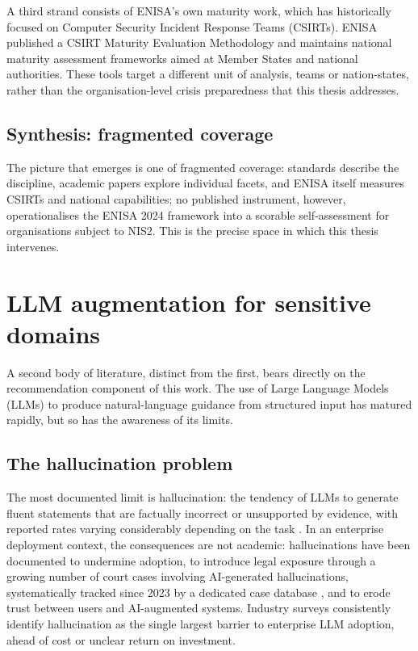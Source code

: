 A third strand consists of ENISA's own maturity work, which has historically focused on Computer Security Incident Response Teams (CSIRTs). ENISA published a CSIRT Maturity Evaluation Methodology \cite{enisa_csirt_maturity_2019} and maintains national maturity assessment frameworks aimed at Member States and national authorities. These tools target a different unit of analysis, teams or nation-states, rather than the organisation-level crisis preparedness that this thesis addresses.

\subsection{Synthesis: fragmented coverage}
\label{sec:soa-fragmented-coverage}

The picture that emerges is one of fragmented coverage: standards describe the discipline, academic papers explore individual facets, and ENISA itself measures CSIRTs and national capabilities; no published instrument, however, operationalises the ENISA 2024 framework into a scorable self-assessment for organisations subject to NIS2. This is the precise space in which this thesis intervenes.

\section{LLM augmentation for sensitive domains}

A second body of literature, distinct from the first, bears directly on the recommendation component of this work. The use of Large Language Models (LLMs) to produce natural-language guidance from structured input has matured rapidly, but so has the awareness of its limits.

\subsection{The hallucination problem}
\label{sec:soa-hallucination-problem}

The most documented limit is hallucination: the tendency of LLMs to generate fluent statements that are factually incorrect or unsupported by evidence, with reported rates varying considerably depending on the task \cite{ji2023survey}. In an enterprise deployment context, the consequences are not academic: hallucinations have been documented to undermine adoption, to introduce legal exposure through a growing number of court cases involving AI-generated hallucinations, systematically tracked since 2023 by a dedicated case database \cite{charlotin_hallucinations_db}, and to erode trust between users and AI-augmented systems. Industry surveys consistently identify hallucination as the single largest barrier to enterprise LLM adoption, ahead of cost or unclear return on investment.

